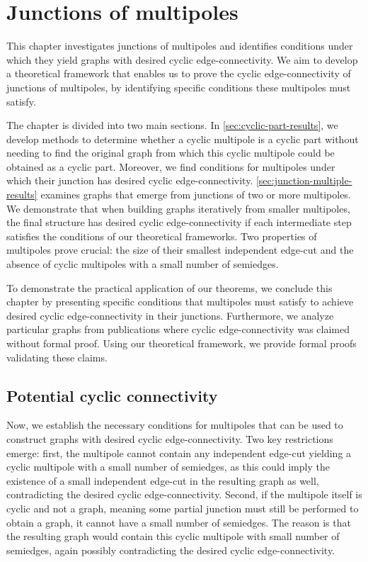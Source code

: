 \documentclass[12pt, twoside]{book}
\begin{document}
\chapter{Junctions of multipoles}\label{ch:junctions-of-multipoles}

This chapter investigates junctions of multipoles and identifies conditions under which they yield graphs with desired cyclic edge-connectivity. We aim to develop a theoretical framework that enables us to prove the cyclic edge-connectivity of junctions of multipoles, by identifying specific conditions these multipoles must satisfy.

The chapter is divided into two main sections. In \cref{sec:cyclic-part-results}, we develop methods to determine whether a cyclic multipole is a cyclic part without needing to find the original graph from which this cyclic multipole could be obtained as a cyclic part. Moreover, we find conditions for multipoles under which their junction has desired cyclic edge-connectivity. \cref{sec:junction-multiple-results} examines graphs that emerge from junctions of two or more multipoles. We demonstrate that when building graphs iteratively from smaller multipoles, the final structure has desired cyclic edge-connectivity if each intermediate step satisfies the conditions of our theoretical frameworks. Two properties of multipoles prove crucial: the size of their smallest independent edge-cut and the absence of cyclic multipoles with a small number of semiedges.

To demonstrate the practical application of our theorems, we conclude this chapter by presenting specific conditions that multipoles must satisfy to achieve desired cyclic edge-connectivity in their junctions. Furthermore, we analyze particular graphs from publications \cite{Macajova2006, Kochol1996} where cyclic edge-connectivity was claimed without formal proof. Using our theoretical framework, we provide formal proofs validating these claims.

\section{Potential cyclic connectivity}

Now, we establish the necessary conditions for multipoles that can be used to construct graphs with desired cyclic edge-connectivity. Two key restrictions emerge: first, the multipole cannot contain any independent edge-cut yielding a cyclic multipole with a small number of semiedges, as this could imply the existence of a small independent edge-cut in the resulting graph as well, contradicting the desired cyclic edge-connectivity. Second, if the multipole itself is cyclic and not a graph, meaning some partial junction must still be performed to obtain a graph, it cannot have a small number of semiedges. The reason is that the resulting graph would contain this cyclic multipole with small number of semiedges, again possibly contradicting the desired cyclic edge-connectivity.
\end{document}
